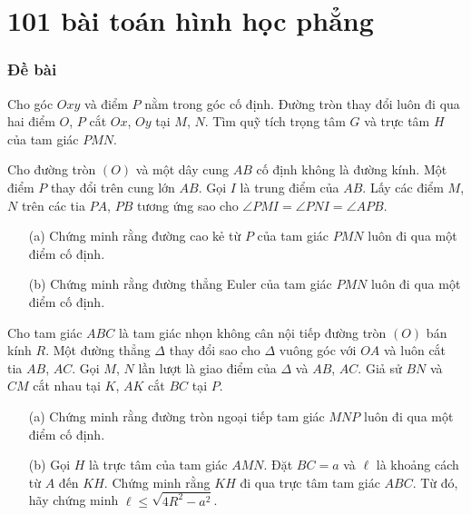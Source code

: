 \part{101 bài toán hình học phẳng}

\setcounter{section}{0}

    \section{Đề bài}

        \begin{exercise}
            Cho góc \(Oxy\) và điểm \(P\) nằm trong góc cố định. Đường tròn thay đổi luôn đi qua hai điểm \(O\), \(P\) cắt \(Ox\), \(Oy\) tại \(M\), \(N\). Tìm quỹ tích trọng tâm \(G\) và trực tâm \(H\) của tam giác \(PMN\).
        \end{exercise}

        \boom

        \begin{exercise}
            Cho đường tròn \((O)\) và một dây cung \(AB\) cố định không là đường kính. Một điểm \(P\) thay đổi trên cung lớn \(AB\). Gọi \(I\) là trung điểm của \(AB\). Lấy các điểm \(M\), \(N\) trên các tia \(PA\), \(PB\) tương ứng sao cho \(\angle PMI = \angle PNI = \angle APB\).
            \begin{enumerate}
                \item[(a)] Chứng minh rằng đường cao kẻ từ \(P\) của tam giác \(PMN\) luôn đi qua một điểm cố định.
                \item[(b)] Chứng minh rằng đường thẳng Euler của tam giác \(PMN\) luôn đi qua một điểm cố định.
            \end{enumerate}
        \end{exercise}

        \boom

        \begin{exercise}
            Cho tam giác \(ABC\) là tam giác nhọn không cân nội tiếp đường tròn \((O)\) bán kính \(R\). Một đường thẳng \(\Delta\) thay đổi sao cho \(\Delta\) vuông góc với \(OA\) và luôn cắt tia \(AB\), \(AC\). Gọi \(M\), \(N\) lần lượt là giao điểm của \(\Delta\) và \(AB\), \(AC\). Giả sử \(BN\) và \(CM\) cắt nhau tại \(K\), \(AK\) cắt \(BC\) tại \(P\).
            \begin{enumerate}
                \item[(a)] Chứng minh rằng đường tròn ngoại tiếp tam giác \(MNP\) luôn đi qua một điểm cố định.
                \item[(b)] Gọi \(H\) là trực tâm của tam giác \(AMN\). Đặt \(BC = a\) và \(\ell\) là khoảng cách từ \(A\) đến \(KH\). Chứng minh rằng \(KH\) đi qua trực tâm tam giác \(ABC\). Từ đó, hãy chứng minh \(\ell \leq \sqrt{4R^2 - a^2}\).
            \end{enumerate}
        \end{exercise}

